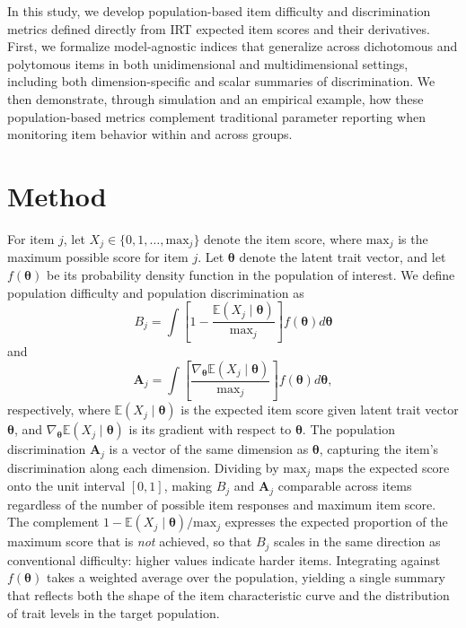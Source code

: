 \documentclass[man, 12pt, floatsintext]{apa7}
\begin{document}
In this study, we develop population-based item difficulty and discrimination metrics defined directly from IRT expected item scores and their derivatives. First, we formalize model-agnostic indices that generalize across dichotomous and polytomous items in both unidimensional and multidimensional settings, including both dimension-specific and scalar summaries of discrimination. We then demonstrate, through simulation and an empirical example, how these population-based metrics complement traditional parameter reporting when monitoring item behavior within and across groups.

\section{Method}
For item $j$, let $X_j \in \{0, 1, \ldots, \mathrm{max}_j\}$ denote the item score, where $\mathrm{max}_j$ is the maximum possible score for item $j$. Let $\boldsymbol{\theta}$ denote the latent trait vector, and let $f(\boldsymbol{\theta})$ be its probability density function in the population of interest. We define population difficulty and population discrimination as
\begin{equation}\label{eq:pop-difficulty}
B_j = \int \left[1 - \frac{\mathbb{E}(X_j \mid \boldsymbol{\theta})}{\mathrm{max}_j}\right] f(\boldsymbol{\theta}) d\boldsymbol{\theta}
\end{equation}
and
\begin{equation}\label{eq:pop-discrimination}
\mathbf{A}_j = \int \left[\frac{\nabla_{\boldsymbol{\theta}}\mathbb{E}(X_j \mid \boldsymbol{\theta})}{\mathrm{max}_j}\right] f(\boldsymbol{\theta}) d\boldsymbol{\theta},
\end{equation}
respectively, where $\mathbb{E}(X_j \mid \boldsymbol{\theta})$ is the expected item score given latent trait vector $\boldsymbol{\theta}$, and $\nabla_{\boldsymbol{\theta}}\mathbb{E}(X_j \mid \boldsymbol{\theta})$ is its gradient with respect to $\boldsymbol{\theta}$. The population discrimination $\mathbf{A}_j$ is a vector of the same dimension as $\boldsymbol{\theta}$, capturing the item's discrimination along each dimension. Dividing by $\mathrm{max}_j$ maps the expected score onto the unit interval $[0, 1]$, making $B_j$ and $\mathbf{A}_j$ comparable across items regardless of the number of possible item responses and maximum item score. The complement $1 - \mathbb{E}(X_j \mid \boldsymbol{\theta})/\mathrm{max}_j$ expresses the expected proportion of the maximum score that is \emph{not} achieved, so that $B_j$ scales in the same direction as conventional difficulty: higher values indicate harder items. Integrating against $f(\boldsymbol{\theta})$ takes a weighted average over the population, yielding a single summary that reflects both the shape of the item characteristic curve and the distribution of trait levels in the target population.
\end{document}
